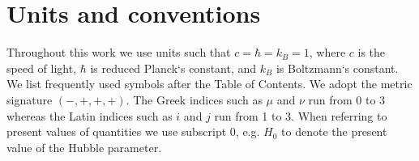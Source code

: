 \section*{Units and conventions}
Throughout this work we use units such that $c=\hbar=k_B=1$, where $c$ is the speed of light, $\hbar$ is reduced Planck`s constant, and $k_B$ is Boltzmann`s constant. We list frequently used symbols after the Table of Contents. We adopt the metric signature $(-, +, +, +)$. The Greek indices such as $\mu$ and $\nu$ run from 0 to 3 whereas the Latin indices such as $i$ and $j$ run from 1 to 3. When referring to present values of quantities we use subscript $0$, e.g. $H_0$ to denote the present value of the Hubble parameter.